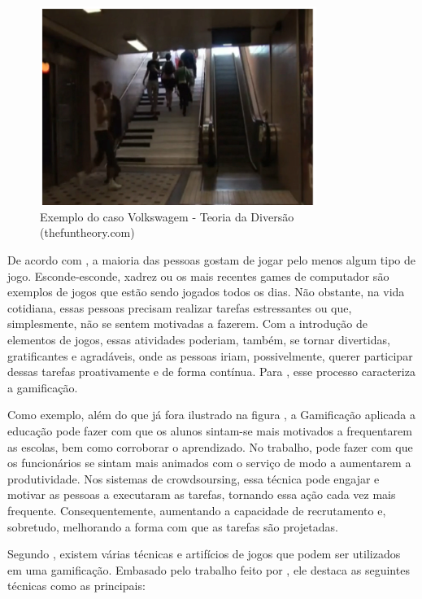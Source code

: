 \begin{figure}[htp]
\begin{center}
  \includegraphics[width=9cm]{images/escada_gamificacao.png}
  \caption[Caso Volkswagem]{Exemplo do caso Volkswagem  - Teoria da Diversão (thefuntheory.com)}
  \label{fig:exampleFigPiano}
\end{center}
\end{figure}

	
De acordo com \cite{hagglund2012}, a maioria das pessoas gostam de jogar pelo menos algum tipo de jogo. Esconde-esconde, xadrez ou os mais recentes games de computador são exemplos de jogos que estão sendo jogados todos os dias. Não obstante, na vida cotidiana, essas pessoas precisam realizar tarefas estressantes ou que, simplesmente, não se sentem motivadas a fazerem. Com a introdução de elementos de jogos, essas atividades poderiam, também, se tornar divertidas, gratificantes e agradáveis, onde as pessoas iriam, possivelmente, querer participar dessas tarefas proativamente e de forma contínua. Para  \cite{hagglund2012}, esse processo caracteriza a  gamificação.  
	
Como exemplo, além do que já fora ilustrado na figura , a Gamificação aplicada a  educação  pode fazer com que os alunos sintam-se mais motivados a frequentarem as escolas, bem como corroborar o aprendizado. No trabalho, pode fazer com que os funcionários se sintam mais animados com o serviço de modo a aumentarem a produtividade.  Nos sistemas de crowdsoursing, essa técnica pode engajar e motivar as pessoas a executaram as tarefas, tornando essa ação cada vez mais frequente. Consequentemente, aumentando a capacidade de recrutamento e, sobretudo, melhorando a forma com que as tarefas são projetadas.          

Segundo \cite{pereira2011}, existem várias técnicas e artifícios de jogos que podem ser utilizados em uma gamificação. Embasado pelo trabalho feito por \cite{lands2011}, ele destaca as seguintes técnicas como as principais:

